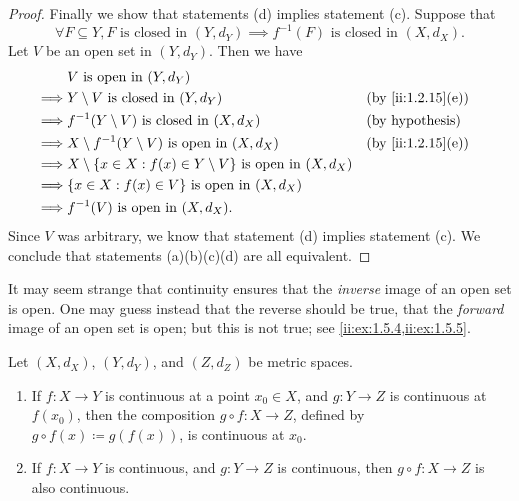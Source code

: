 \begin{proof}
  Finally we show that statements (d) implies statement (c).
  Suppose that
  \[
    \forall F \subseteq Y, F \text{ is closed in } (Y, d_Y) \implies f^{-1}(F) \text{ is closed in } (X, d_X).
  \]
  Let \(V\) be an open set in \((Y, d_Y)\).
  Then we have
  \begin{align*}
             & V \text{ is open in } (Y, d_Y)                                                                              \\
    \implies & Y \setminus V \text{ is closed in } (Y, d_Y)                                    &  & \by{ii:1.2.15}[e]      \\
    \implies & f^{-1}(Y \setminus V) \text{ is closed in } (X, d_X)                            &  & \text{(by hypothesis)} \\
    \implies & X \setminus f^{-1}(Y \setminus V) \text{ is open in } (X, d_X)                  &  & \by{ii:1.2.15}[e]      \\
    \implies & X \setminus \set{x \in X : f(x) \in Y \setminus V} \text{ is open in } (X, d_X)                             \\
    \implies & \set{x \in X : f(x) \in V} \text{ is open in } (X, d_X)                                                     \\
    \implies & f^{-1}(V) \text{ is open in } (X, d_X).
  \end{align*}
  Since \(V\) was arbitrary, we know that statement (d) implies statement (c).
  We conclude that statements (a)(b)(c)(d) are all equivalent.
\end{proof}

\begin{rmk}\label{ii:2.1.6}
  It may seem strange that continuity ensures that the \emph{inverse} image of an open set is open.
  One may guess instead that the reverse should be true, that the \emph{forward} image of an open set is open;
  but this is not true;
  see \cref{ii:ex:1.5.4,ii:ex:1.5.5}.
\end{rmk}

\begin{cor}\label{ii:2.1.7}
  Let \((X, d_X)\), \((Y, d_Y)\), and \((Z, d_Z)\) be metric spaces.
  \begin{enumerate}
    \item If \(f : X \to Y\) is continuous at a point \(x_0 \in X\), and \(g : Y \to Z\) is continuous at \(f(x_0)\), then the composition \(g \circ f : X \to Z\), defined by \(g \circ f(x) \coloneqq g(f(x))\), is continuous at \(x_0\).
    \item If \(f : X \to Y\) is continuous, and \(g : Y \to Z\) is continuous, then \(g \circ f : X \to Z\) is also continuous.
  \end{enumerate}
\end{cor}

